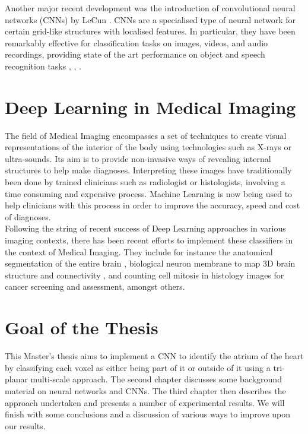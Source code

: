 \noindent Another major recent development was the introduction of convolutional neural networks (CNNs) by LeCun \citep{Lecun98gradient-basedlearning}. CNNs are a specialised type of neural network for certain grid-like structures with localised features. In particular, they have been remarkably effective for classification tasks on images, videos, and audio recordings, providing state of the art performance on object and speech recognition tasks \citep{NIPS2010_4133}, \citep{going_deeper_with_convolutions}, \citep{NIPS2012_4824}.\\

\section{Deep Learning in Medical Imaging}

\noindent The field of Medical Imaging encompasses a set of techniques to create visual representations of the interior of the body using technologies such as X-rays or ultra-sounds. Its aim is to provide non-invasive ways of revealing internal structures to help make diagnoses. Interpreting these images have traditionally been done by trained clinicians such as radiologist or histologists, involving a time consuming and expensive process. Machine Learning is now being used to help clinicians with this process \citep{key:article} in order to improve the accuracy, speed and cost of diagnoses.\\

\noindent Following the string of recent success of Deep Learning approaches in various imaging contexts, there has been recent efforts to implement these classifiers in the context of Medical Imaging. They include for instance the anatomical segmentation of the entire brain \citep{DBLP:journals/corr/BrebissonM15}, biological neuron membrane to map 3D brain structure and connectivity \citep{NIPS2012_4741}, and counting cell mitosis in histology images \citep{Ciresan} for cancer screening and assessment, amongst others.\\

\section{Goal of the Thesis}

This Master's thesis aims to implement a CNN to identify the atrium of the heart by classifying each voxel as either being part of it or outside of it using a tri-planar multi-scale approach. The second chapter discusses some background material on neural networks and CNNs. The third chapter then describes the approach undertaken and presents a number of experimental results. We will finish with some conclusions and a discussion of various ways to improve upon our results.











